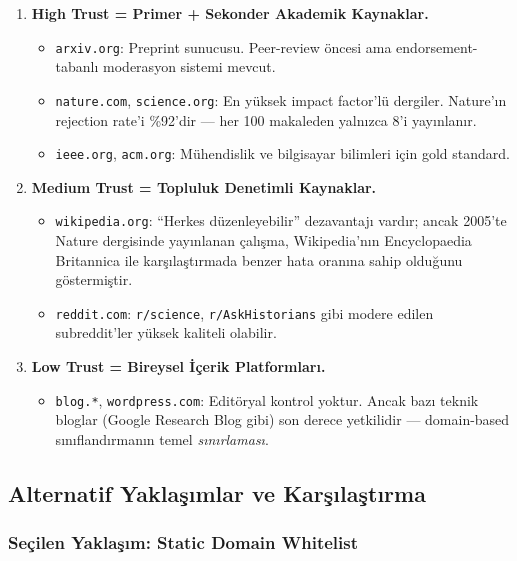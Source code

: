 \begin{enumerate}
  \item \textbf{High Trust = Primer + Sekonder Akademik Kaynaklar.}
    \begin{itemize}[leftmargin=1.5em]
      \item \texttt{arxiv.org}: Preprint sunucusu. Peer-review \"{o}ncesi ama endorsement-tabanl{\i} moderasyon sistemi mevcut.
      \item \texttt{nature.com}, \texttt{science.org}: En y\"{u}ksek impact factor'l\"{u} dergiler. Nature'{\i}n rejection rate'i \%92'dir --- her 100 makaleden yaln{\i}zca 8'i yay{\i}nlan{\i}r.
      \item \texttt{ieee.org}, \texttt{acm.org}: M\"{u}hendislik ve bilgisayar bilimleri i\c{c}in gold standard.
    \end{itemize}

  \item \textbf{Medium Trust = Topluluk Denetimli Kaynaklar.}
    \begin{itemize}[leftmargin=1.5em]
      \item \texttt{wikipedia.org}: ``Herkes d\"{u}zenleyebilir'' dezavantaj{\i} vard{\i}r; ancak 2005'te Nature dergisinde yay{\i}nlanan \c{c}al{\i}\c{s}ma, Wikipedia'n{\i}n Encyclopaedia Britannica ile kar\c{s}{\i}la\c{s}t{\i}rmada benzer hata oran{\i}na sahip oldu\u{g}unu g\"{o}stermi\c{s}tir.
      \item \texttt{reddit.com}: \texttt{r/science}, \texttt{r/AskHistorians} gibi modere edilen subreddit'ler y\"{u}ksek kaliteli olabilir.
    \end{itemize}

  \item \textbf{Low Trust = Bireysel \.{I}\c{c}erik Platformlar{\i}.}
    \begin{itemize}[leftmargin=1.5em]
      \item \texttt{blog.*}, \texttt{wordpress.com}: Edit\"{o}ryal kontrol yoktur. Ancak baz{\i} teknik bloglar (Google Research Blog gibi) son derece yetkilidir --- domain-based s{\i}n{\i}fland{\i}rman{\i}n temel \emph{s{\i}n{\i}rlamas{\i}}.
    \end{itemize}
\end{enumerate}

\subsection{Alternatif Yakla\c{s}{\i}mlar ve Kar\c{s}{\i}la\c{s}t{\i}rma}

\subsubsection{Se\c{c}ilen Yakla\c{s}{\i}m: Static Domain Whitelist}

